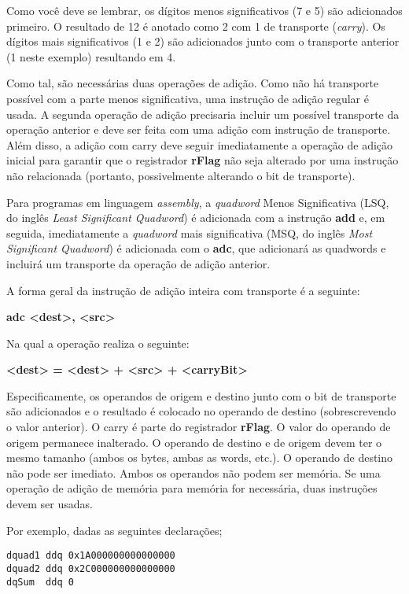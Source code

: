 Como você deve se lembrar, os dígitos menos significativos (7 e 5) são adicionados primeiro. O resultado de 12 é anotado como 2 com 1 de transporte (\textit{carry}). Os dígitos mais significativos (1 e 2) são adicionados junto com o transporte anterior (1 neste exemplo) resultando em 4.

Como tal, são necessárias duas operações de adição. Como não há transporte possível com a parte menos significativa, uma instrução de adição regular é usada. A segunda operação de adição precisaria incluir um possível transporte da operação anterior e deve ser feita com uma adição com instrução de transporte. Além disso, a adição com carry deve seguir imediatamente a operação de adição inicial para garantir que o registrador \textbf{rFlag} não seja alterado por uma instrução não relacionada (portanto, possivelmente alterando o bit de transporte).

Para programas em linguagem \textit{assembly}, a \textit{quadword} Menos Significativa (LSQ, do inglês \textit{Least Significant Quadword}) é adicionada com a instrução \textbf{add} e, em seguida, imediatamente a \textit{quadword} mais significativa (MSQ, do inglês \textit{Most Significant Quadword}) é adicionada com o \textbf{adc}, que adicionará as quadwords e incluirá um transporte da operação de adição anterior.

A forma geral da instrução de adição inteira  com transporte é a seguinte:
\begin{center}
	\textbf{adc <dest>, <src>}
\end{center}

Na qual a operação realiza o seguinte:
\begin{center}
	\textbf{<dest> = <dest> + <src> + <carryBit>}
\end{center}

Especificamente, os operandos de origem e destino junto com o bit de transporte são adicionados e o resultado é colocado no operando de destino (sobrescrevendo o valor anterior). O carry é parte do registrador \textbf{rFlag}. O valor do operando de origem permanece inalterado. O operando de destino e de origem devem ter o mesmo tamanho (ambos os bytes, ambas as words, etc.). O operando de destino não pode ser imediato. Ambos os operandos não podem ser memória. Se uma operação de adição de memória para memória for necessária, duas instruções devem ser usadas.

Por exemplo, dadas as seguintes declarações;
\begin{lstlisting}
dquad1 ddq 0x1A000000000000000
dquad2 ddq 0x2C000000000000000
dqSum  ddq 0
\end{lstlisting}

